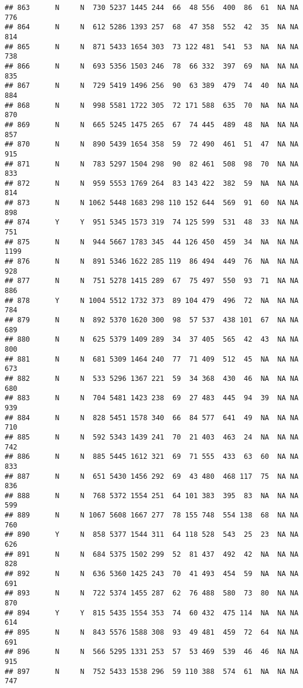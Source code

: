 \documentclass[]{article}
\begin{document}
\begin{verbatim}
## 863      N     N  730 5237 1445 244  66  48 556  400  86  61  NA NA  776
## 864      N     N  612 5286 1393 257  68  47 358  552  42  35  NA NA  814
## 865      N     N  871 5433 1654 303  73 122 481  541  53  NA  NA NA  738
## 866      N     N  693 5356 1503 246  78  66 332  397  69  NA  NA NA  835
## 867      N     N  729 5419 1496 256  90  63 389  479  74  40  NA NA  884
## 868      N     N  998 5581 1722 305  72 171 588  635  70  NA  NA NA  870
## 869      N     N  665 5245 1475 265  67  74 445  489  48  NA  NA NA  857
## 870      N     N  890 5439 1654 358  59  72 490  461  51  47  NA NA  915
## 871      N     N  783 5297 1504 298  90  82 461  508  98  70  NA NA  833
## 872      N     N  959 5553 1769 264  83 143 422  382  59  NA  NA NA  814
## 873      N     N 1062 5448 1683 298 110 152 644  569  91  60  NA NA  898
## 874      Y     Y  951 5345 1573 319  74 125 599  531  48  33  NA NA  751
## 875      N     N  944 5667 1783 345  44 126 450  459  34  NA  NA NA 1199
## 876      N     N  891 5346 1622 285 119  86 494  449  76  NA  NA NA  928
## 877      N     N  751 5278 1415 289  67  75 497  550  93  71  NA NA  886
## 878      Y     N 1004 5512 1732 373  89 104 479  496  72  NA  NA NA  784
## 879      N     N  892 5370 1620 300  98  57 537  438 101  67  NA NA  689
## 880      N     N  625 5379 1409 289  34  37 405  565  42  43  NA NA  800
## 881      N     N  681 5309 1464 240  77  71 409  512  45  NA  NA NA  673
## 882      N     N  533 5296 1367 221  59  34 368  430  46  NA  NA NA  680
## 883      N     N  704 5481 1423 238  69  27 483  445  94  39  NA NA  939
## 884      N     N  828 5451 1578 340  66  84 577  641  49  NA  NA NA  710
## 885      N     N  592 5343 1439 241  70  21 403  463  24  NA  NA NA  742
## 886      N     N  885 5445 1612 321  69  71 555  433  63  60  NA NA  833
## 887      N     N  651 5430 1456 292  69  43 480  468 117  75  NA NA  836
## 888      N     N  768 5372 1554 251  64 101 383  395  83  NA  NA NA  599
## 889      N     N 1067 5608 1667 277  78 155 748  554 138  68  NA NA  760
## 890      Y     N  858 5377 1544 311  64 118 528  543  25  23  NA NA  626
## 891      N     N  684 5375 1502 299  52  81 437  492  42  NA  NA NA  828
## 892      N     N  636 5360 1425 243  70  41 493  454  59  NA  NA NA  691
## 893      N     N  722 5374 1455 287  62  76 488  580  73  80  NA NA  870
## 894      Y     Y  815 5435 1554 353  74  60 432  475 114  NA  NA NA  614
## 895      N     N  843 5576 1588 308  93  49 481  459  72  64  NA NA  691
## 896      N     N  566 5295 1331 253  57  53 469  539  46  46  NA NA  915
## 897      N     N  752 5433 1538 296  59 110 388  574  61  NA  NA NA  747

\end{verbatim}
\end{document}
